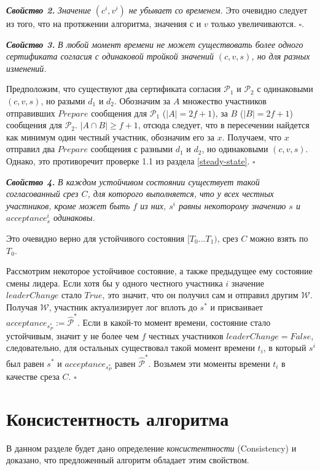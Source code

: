 \textbf{\textit{Свойство 2.}} \textit{Значение $(c^i, v^i)$ не убывает со временем.}
Это очевидно следует из того, что на протяжении алгоритма, значения $с$ и $v$ только увеличиваются. $\square$.
\vspace{10pt}

\textbf{\textit{Свойство 3.}} \textit{В любой момент времени не может существовать более одного сертификата согласия с одинаковой тройкой значений $(c, v, s)$, но для разных изменений.} 

Предположим, что существуют два сертификата согласия $\mathcal{P}_1$ и $\mathcal{P}_2$ с одинаковыми $(c, v, s)$, но разыми $d_1$ и $d_2$. 
Обозначим за $A$ множество участников отправивших $Prepare$ сообщения для  $\mathcal{P}_1$ ($|A|=2f+1$), за $B$ ($|B|=2f+1$) сообщения для $\mathcal{P}_2$. $|A \cap B| \ge f+1$, отсюда следует, что в пересечении найдется как минимум один честный участник,  обозначим его за $x$. Получаем, что $x$ отправил два $Prepare$ сообщения с разными $d_1$ и $d_2$, но одинаковыми $(c, v, s)$. Однако, это противоречит проверке 1.1 из раздела \ref{steady-state}. $\square$
\vspace{10pt}

\textbf{\textit{Свойство 4.}} \textit{В каждом устойчивом состоянии существует такой согласованный срез $C$, для которого выполняется, что у всех честных участников, кроме может быть $f$ из них, $s^i$ равны некоторому значению $s$ и $acceptance^i_s$ одинаковы.}

Это очевидно верно для устойчивого состояния $[T_0...T_1)$, срез $C$ можно взять по $T_0$.

Рассмотрим некоторое устойчивое состояние, а также предыдущее ему состояние смены лидера.
Если хотя бы у одного честного участника $i$ значение $leaderChange$ стало $True$, это значит, что он получил сам и отправил другим $\mathcal{W}$. Получая $\mathcal{W}$, участник актуализирует лог вплоть до $s^{*}$ и присваивает $acceptance_{s_P^{*}} := \hat{\mathcal{P}}^{*}$. Если в какой-то момент времени, состояние стало устойчивым, значит у не более чем $f$ честных участников $leaderChange = False$, следовательно, для остальных существовал такой момент времени $t_i$, в который $s^i$ был равен $s^{*}$ и $acceptance_{s_P^{*}}$ равен $\hat{\mathcal{P}}^{*}$. Возьмем эти моменты времени $t_i$ в качестве среза $C$. $\square$

\section{Консистентность алгоритма}
В данном разделе будет дано определение \textit{консистентности} (Consistency)\cite{hybrid-consensus} и доказано, что предложенный алгоритм обладает этим свойством.

